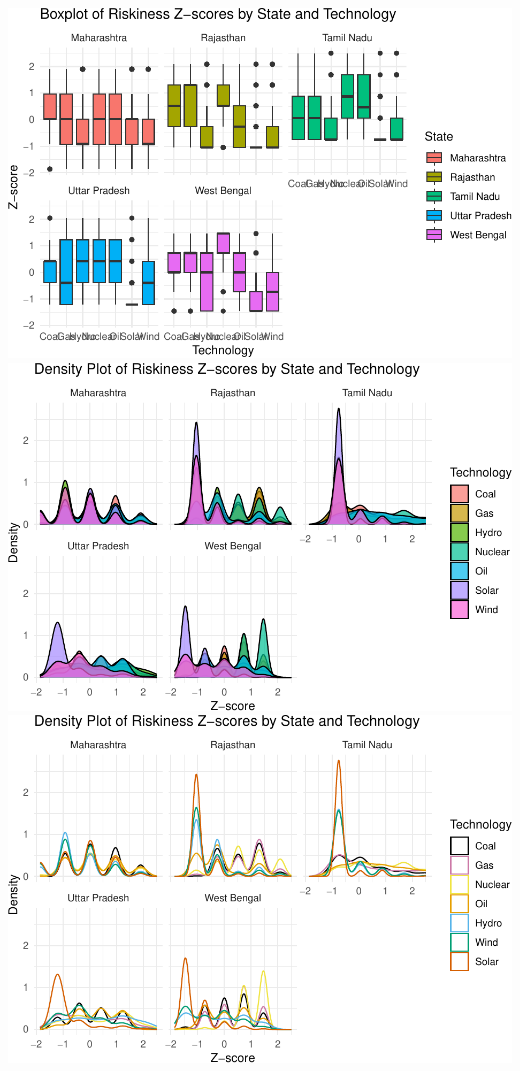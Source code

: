 \documentclass[
]{article}
\begin{document}
\includegraphics{nuclear-in-comparison_files/figure-latex/unnamed-chunk-40-1.pdf}
\includegraphics{nuclear-in-comparison_files/figure-latex/unnamed-chunk-40-2.pdf}
\includegraphics{nuclear-in-comparison_files/figure-latex/unnamed-chunk-40-3.pdf}
\end{document}
